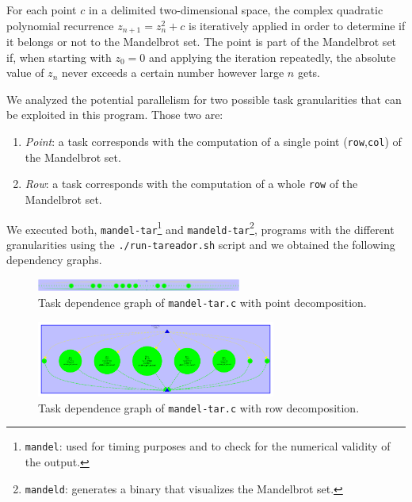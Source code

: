For each point $c$ in a delimited two-dimensional space, the complex quadratic polynomial recurrence $z_{n+1} = z^2_n + c$ is iteratively applied in order to determine if it belongs or not to the Mandelbrot set.  The point is part of the Mandelbrot set if, when starting with $z_0 = 0$ and applying the iteration repeatedly, the absolute value of $z_n$ never exceeds a certain number however large $n$ gets.

We analyzed the potential parallelism for two possible task granularities that can be exploited in this program. Those two are:
\begin{enumerate}[label=\alph*)]
\item \emph{Point}: a task corresponds with the computation of a single point (\texttt{row},\texttt{col}) of the Mandelbrot set.
\item \emph{Row}: a task corresponds with the computation of a whole \texttt{row} of the Mandelbrot set.
\end{enumerate}

We executed both, \texttt{mandel-tar}\footnote{\texttt{mandel}: used for timing purposes and to check for the numerical validity of the output.} and \texttt{mandeld-tar}\footnote{\texttt{mandeld}: generates a binary that visualizes the Mandelbrot set.}, programs with the different granularities using the \texttt{./run-tareador.sh} script and we obtained the following dependency graphs.

\begin{figure}[H]
\centering
\includegraphics[width=0.6\textwidth]{plots/dependency_graph_mandel_point.pdf}
\caption{Task dependence graph of \texttt{mandel-tar.c} with point decomposition.}
\label{graph:mandel_point}
\end{figure}

\begin{figure}[H]
\centering
\includegraphics[width=0.7\textwidth]{plots/dependency_graph_mandel_row.pdf}
\caption{Task dependence graph of \texttt{mandel-tar.c} with row decomposition.}
\label{graph:mandel_row}
\end{figure}


